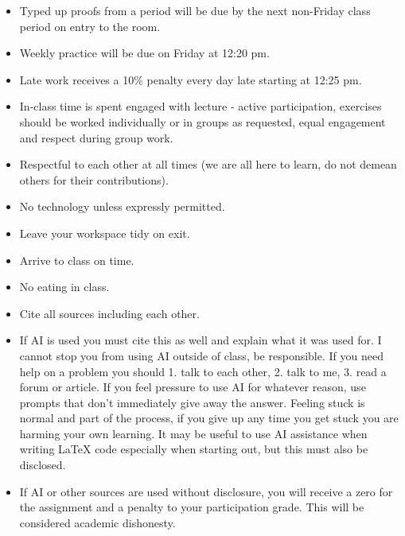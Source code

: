 \documentclass{article}
\begin{document}
\begin{itemize}
\item Typed up proofs from a period will be due by the next non-Friday class period on entry to the room.

\item Weekly practice will be due on Friday at 12:20 pm.

\item Late work receives a 10\% penalty every day late starting at 12:25 pm.

\item In-class time is spent engaged with lecture - active participation, exercises should be worked individually or in groups as requested, equal engagement and respect during group work.

\item Respectful to each other at all times (we are all here to learn, do not demean others for their contributions).

\item No technology unless expressly permitted.

\item Leave your workspace tidy on exit.

\item Arrive to class on time.

\item No eating in class.

\item Cite all sources including each other.

\item If AI is used you must cite this as well and explain what it was used for.
I cannot stop you from using AI outside of class, be responsible.
If you need help on a problem you should 1. talk to each other, 2. talk to me, 3. read a forum or article.
If you feel pressure to use AI for whatever reason, use prompts that don't immediately give away the answer.
Feeling stuck is normal and part of the process, if you give up any time you get stuck you are harming your own learning.
It may be useful to use AI assistance when writing LaTeX code especially when starting out, but this must also be disclosed.

\item If AI or other sources are used without disclosure, you will receive a zero for the assignment and a penalty to your participation grade.
This will be considered academic dishonesty.
\end{itemize}
\end{document}
